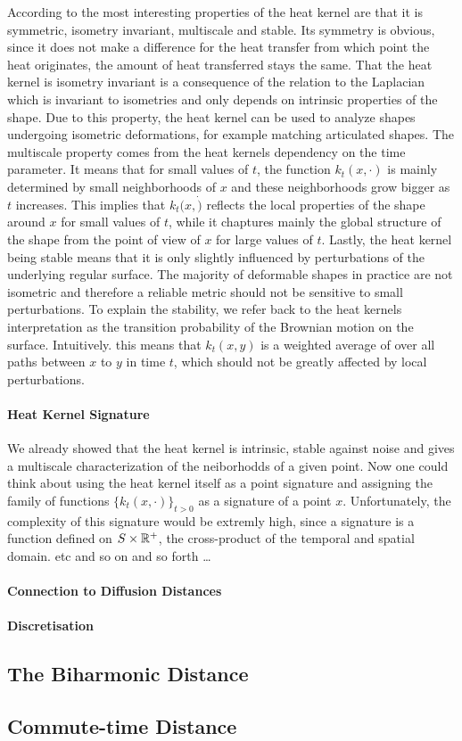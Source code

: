 According to \cite{sun2009concise} the most interesting properties of the heat kernel are that it is symmetric, isometry invariant, multiscale and stable.
Its symmetry is obvious, since it does not make a difference for the heat transfer from which point the heat originates, the amount of heat transferred stays the same.
That the heat kernel is isometry invariant is a consequence of the relation to the Laplacian which is invariant to isometries and only depends on intrinsic properties of the shape.
Due to this property, the heat kernel can be used to analyze shapes undergoing isometric deformations, for example matching articulated shapes.
The multiscale property comes from the heat kernels dependency on the time parameter.
It means that for small values of $t$, the function $k_t(x,\cdot)$ is mainly determined by small neighborhoods of $x$ and these neighborhoods grow bigger as $t$ increases.
This implies that $k_t(x,\dot)$ reflects the local properties of the shape around $x$ for small values of $t$, while it chaptures mainly the global structure of the shape from the point of view of $x$ for large values of $t$.
Lastly, the heat kernel being stable means that it is only slightly influenced by perturbations of the underlying regular surface.
The majority of deformable shapes in practice are not isometric and therefore a reliable metric should not be sensitive to small perturbations.
To explain the stability, we refer back to the heat kernels  interpretation as the transition probability of the Brownian motion on the surface.
Intuitively. this means that $k_t(x,y)$ is a weighted average of over all paths between $x$ to $y$ in time $t$, which should not be greatly affected by local perturbations.

\paragraph{Heat Kernel Signature}
We already showed that the  heat kernel is intrinsic, stable against noise and gives a multiscale characterization of the neiborhodds of a given point.
Now one could think about using the heat kernel itself as a point signature and assigning the family of functions $\{k_t(x,\cdot)\}_{t>0}$ as a signature of a point $x$.
Unfortunately, the complexity of this signature would be extremly high, since a signature is a function defined on $S \times \mathbb{R}^+$, the cross-product of the temporal and spatial domain.
etc and so on and so forth \ldots
\paragraph{Connection to Diffusion Distances}
\paragraph{Discretisation}

\subsection{The Biharmonic Distance}
\subsection{Commute-time Distance}
